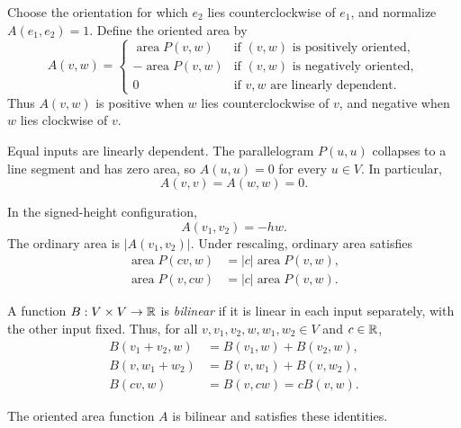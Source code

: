 Choose the orientation for which \(e_2\) lies counterclockwise of \(e_1\),
and normalize \(A(e_1,e_2)=1\). Define the oriented area by
\[
  A(v,w)=
  \begin{cases}
    \operatorname{area}P(v,w) & \text{if \((v,w)\) is positively oriented},\\
    -\operatorname{area}P(v,w) & \text{if \((v,w)\) is negatively oriented},\\
    0 & \text{if \(v,w\) are linearly dependent}.
  \end{cases}
\]
Thus \(A(v,w)\) is positive when \(w\) lies counterclockwise of \(v\),
and negative when \(w\) lies clockwise of \(v\).

Equal inputs are linearly dependent. The parallelogram \(P(u,u)\)
collapses to a line segment and has zero area, so \(A(u,u)=0\) for
every \(u\in V\). In particular,
\[
  A(v,v)=A(w,w)=0.
\]

In the signed-height configuration,
\[
  A(v_1,v_2)=-hw.
\]
The ordinary area is \(|A(v_1,v_2)|\).
Under rescaling, ordinary area satisfies
\[
  \begin{aligned}
    \operatorname{area}P(cv,w)&=|c|\operatorname{area}P(v,w),\\
    \operatorname{area}P(v,cw)&=|c|\operatorname{area}P(v,w).
  \end{aligned}
\]

\begin{definition}
  \label{thm:linear-algebra-i:bilinear-function}
  A function \(B:V\times V\to\mathbb{R}\) is \emph{bilinear} if it is linear
  in each input separately, with the other input fixed. Thus, for all
  \(v,v_1,v_2,w,w_1,w_2\in V\) and \(c\in\mathbb{R}\),
  \[
    \begin{aligned}
      B(v_1+v_2,w)&=B(v_1,w)+B(v_2,w),\\
      B(v,w_1+w_2)&=B(v,w_1)+B(v,w_2),\\
      B(cv,w)&=B(v,cw)=cB(v,w).
    \end{aligned}
  \]
\end{definition}

The oriented area function \(A\) is bilinear and satisfies these identities.

